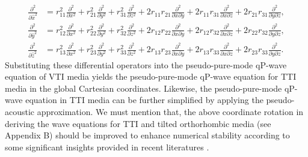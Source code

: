 \begin{equation}
\label{eq:difoper}
\begin{split}
\frac{\partial^2}{\partial{\widehat{x}^2}} &= {r_{11}^2}\frac{\partial^2}{\partial x^2}
                                           + {r_{21}^2}\frac{\partial^2}{\partial y^2}
                                           + {r_{31}^2}\frac{\partial^2}{\partial z^2}
                                           + 2r_{11}r_{21}\frac{\partial^2}{{\partial x}{\partial y}}
                                           + 2r_{11}r_{31}\frac{\partial^2}{{\partial x}{\partial z}}
                                           + 2r_{21}r_{31}\frac{\partial^2}{{\partial y}{\partial z}}, \\
\frac{\partial^2}{\partial{\widehat{y}^2}} &= {r_{12}^2}\frac{\partial^2}{\partial x^2}
                                           + {r_{22}^2}\frac{\partial^2}{\partial y^2}
                                           + {r_{32}^2}\frac{\partial^2}{\partial z^2}
                                           + 2r_{12}r_{22}\frac{\partial^2}{{\partial x}{\partial y}}
                                           + 2r_{12}r_{32}\frac{\partial^2}{{\partial x}{\partial z}}
                                           + 2r_{22}r_{32}\frac{\partial^2}{{\partial y}{\partial z}}, \\
\frac{\partial^2}{\partial{\widehat{z}^2}} &= {r_{13}^2}\frac{\partial^2}{\partial x^2}
                                           + {r_{23}^2}\frac{\partial^2}{\partial y^2}
                                           + {r_{33}^2}\frac{\partial^2}{\partial z^2}
                                           + 2r_{13}r_{23}\frac{\partial^2}{{\partial x}{\partial y}}
                                           + 2r_{13}r_{33}\frac{\partial^2}{{\partial x}{\partial z}}
                                           + 2r_{23}r_{33}\frac{\partial^2}{{\partial y}{\partial z}}.
\end{split}
\end{equation}
Substituting these differential operators into the pseudo-pure-mode qP-wave equation of VTI media 
 yields the pseudo-pure-mode qP-wave equation for TTI media in the global Cartesian coordinates.
Likewise, the pseudo-pure-mode qP-wave equation in TTI media can be further simplified by applying the pseudo-acoustic approximation.
We must mention that, the above
coordinate rotation in deriving the wave equations for TTI and tilted orthorhombic media (see Appendix B)
 should be improved to enhance numerical stability according to some significant insights provided in recent literatures  
 \cite[]{duveneck:2011,macesanu,zhang:2011,bube:2012}.
